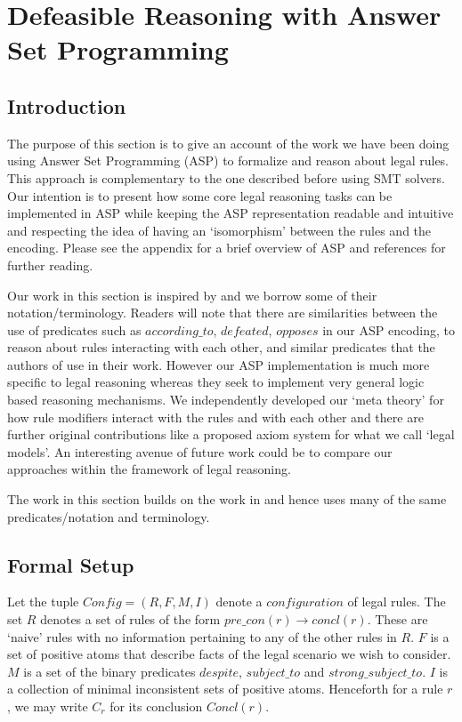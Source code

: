 \section{Defeasible Reasoning with Answer Set Programming}\label{sec:defeasible_asp}



\subsection{Introduction}
The purpose of this section is to give an account of the work we have been doing using Answer Set Programming (ASP) to formalize and reason about legal rules. This approach is complementary to the one described before using SMT solvers. Our intention is to present how some core legal reasoning tasks can be implemented in ASP while keeping the ASP representation readable and intuitive and respecting the idea of having an `isomorphism' between the rules and the encoding. Please see the appendix for a brief overview of ASP and references for further reading.

Our work in this section is inspired by \cite{DBLP:conf/iclp/WanGKFL09} and we borrow some of their notation/terminology. Readers will note that there are similarities between the use of predicates such as $according\_to$, $defeated$, $opposes$ in our ASP encoding, to reason about rules interacting with each other, and similar predicates that the authors of \cite{DBLP:conf/iclp/WanGKFL09} use in their work. However our ASP implementation is much more specific to legal reasoning whereas they seek to implement very general logic based reasoning mechanisms. We independently developed our `meta theory' for how rule modifiers interact with the rules and with each other and there are further original contributions like a proposed axiom system for what we call `legal models'. An interesting avenue of future work could be to compare our approaches within the framework of legal reasoning.

The work in this section builds on the work in \cite{morris21:_const_answer_set_progr_tool} and hence uses many of the same predicates/notation and terminology. 


\subsection{Formal Setup}
Let the tuple $Config = (R,F,M,I)$ denote a $configuration$ of legal rules. The set $R$ denotes a set of rules of the form $pre\_con(r)\rightarrow concl(r)$. These are `naive' rules with no information pertaining to any of the other rules in $R$. $F$ is a set of positive atoms that describe facts of the legal scenario we wish to consider. $M$ is a set of the binary predicates $despite$, $subject\_to$ and $strong\_subject\_to$. $I$ is a collection of minimal inconsistent sets of positive atoms. Henceforth for a rule $r$, we may write $C_{r}$ for its conclusion $Concl(r)$.

